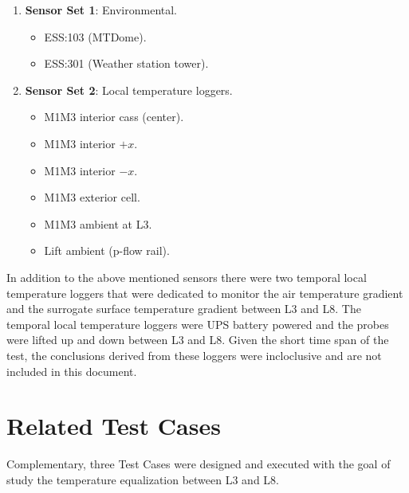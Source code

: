 \documentclass[SE,lsstdraft,authoryear,toc]{lsstdoc}
\begin{document}
\begin{enumerate}
  \item \textbf{Sensor Set 1}: Environmental.
  \begin{itemize}
    \item ESS:103 (MTDome).
    \item ESS:301 (Weather station tower).
  \end{itemize}
  \item \textbf{Sensor Set 2}: Local temperature loggers.
  \begin{itemize}
    \item M1M3 interior cass (center).
    \item M1M3 interior $+x$.
    \item M1M3 interior $-x$.
    \item M1M3 exterior cell.
    \item M1M3 ambient at L3.
    \item Lift ambient (p-flow rail).
  \end{itemize}
\end{enumerate}

In addition to the above mentioned sensors there were two temporal local temperature loggers that were dedicated to monitor the air temperature gradient and the surrogate surface temperature gradient between L3 and L8. The temporal local temperature loggers were UPS battery powered and the probes were lifted up and down between L3 and L8. Given the short time span of the test, the conclusions derived from these loggers were incloclusive and are not included in this document.

\section{Related Test Cases}
\label{sec_test_cases}

Complementary, three Test Cases were designed and executed with the goal of study the temperature equalization between L3 and L8.
\end{document}
